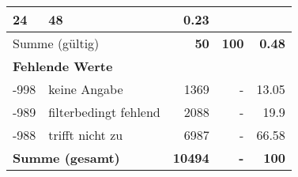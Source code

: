 \begin{longtable}{lXrrr}
       \num{24} &
       \num[round-mode=places,round-precision=2]{48} &
         \num[round-mode=places,round-precision=2]{0,23} \\
     \midrule
     \multicolumn{2}{l}{Summe (gültig)} &
       \textbf{\num{50}} &
     \textbf{100} &
       \textbf{\num[round-mode=places,round-precision=2]{0,48}} \\
     \multicolumn{5}{l}{\textbf{Fehlende Werte}}\\
       -998 &
       keine Angabe &
         \num{1369} &
        - &
         \num[round-mode=places,round-precision=2]{13,05} \\
       -989 &
       filterbedingt fehlend &
         \num{2088} &
        - &
         \num[round-mode=places,round-precision=2]{19,9} \\
       -988 &
       trifft nicht zu &
         \num{6987} &
        - &
         \num[round-mode=places,round-precision=2]{66,58} \\
     \midrule
     \multicolumn{2}{l}{\textbf{Summe (gesamt)}} &
          \textbf{\num{10494}} &
        \textbf{-} &
        \textbf{100} \\
     \bottomrule
     \end{longtable}
     
